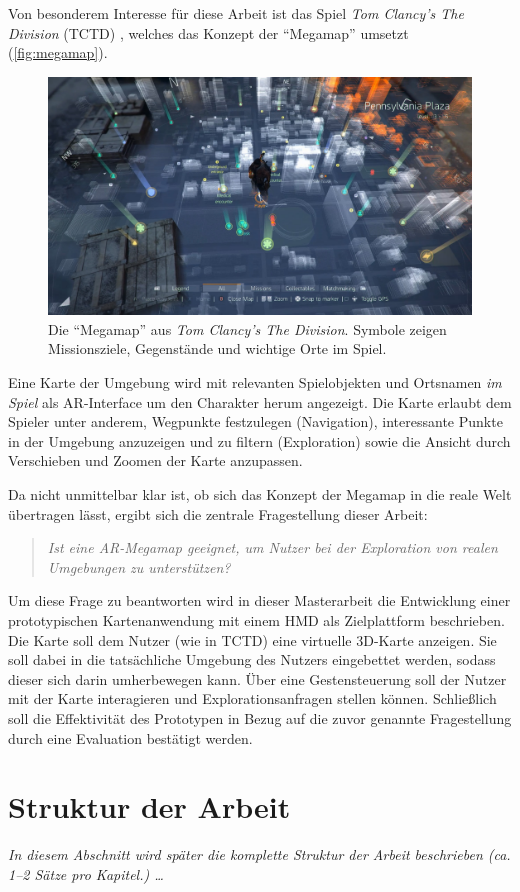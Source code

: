 Von besonderem Interesse für diese Arbeit ist das Spiel \emph{Tom Clancy's The Division} (TCTD) \parencite{Ubisoft2018}, welches das Konzept der \enquote{Megamap} umsetzt (\autoref{fig:megamap}).
\begin{figure}[h]
    \centering
    \includegraphics[width=\textwidth]{figures/the_division_megamap.jpg}
    \caption{Die \enquote{Megamap} aus \emph{Tom Clancy's The Division}. Symbole zeigen Missionsziele, Gegenstände und wichtige Orte im Spiel. }
    \label{fig:megamap}
\end{figure}
Eine Karte der Umgebung wird mit relevanten Spielobjekten und Ortsnamen \emph{im Spiel} als AR-Interface um den Charakter herum angezeigt.
Die Karte erlaubt dem Spieler unter anderem, Wegpunkte festzulegen (Navigation), interessante Punkte in der Umgebung anzuzeigen und zu filtern (Exploration) sowie die Ansicht durch Verschieben und Zoomen der Karte anzupassen.

Da nicht unmittelbar klar ist, ob sich das Konzept der Megamap in die reale Welt übertragen lässt, ergibt sich die zentrale Fragestellung dieser Arbeit:
\begin{quote}
\itshape
Ist eine AR-Megamap geeignet, um Nutzer bei der Exploration von \emph{realen} Umgebungen zu unterstützen?
\end{quote}
Um diese Frage zu beantworten wird in dieser Masterarbeit die Entwicklung einer prototypischen Kartenanwendung mit einem HMD als Zielplattform beschrieben.
Die Karte soll dem Nutzer (wie in TCTD) eine virtuelle 3D-Karte anzeigen.
Sie soll dabei in die tatsächliche Umgebung des Nutzers eingebettet werden, sodass dieser sich darin umherbewegen kann.
Über eine Gestensteuerung soll der Nutzer mit der Karte interagieren und Explorationsanfragen stellen können.
Schließlich soll die Effektivität des Prototypen in Bezug auf die zuvor genannte Fragestellung durch eine Evaluation bestätigt werden.

\section{Struktur der Arbeit}
\label{sec:struktur}
{\itshape In diesem Abschnitt wird später die komplette Struktur der Arbeit beschrieben (ca. 1--2 Sätze pro Kapitel.) \dots}

%
\cleardoublepage
